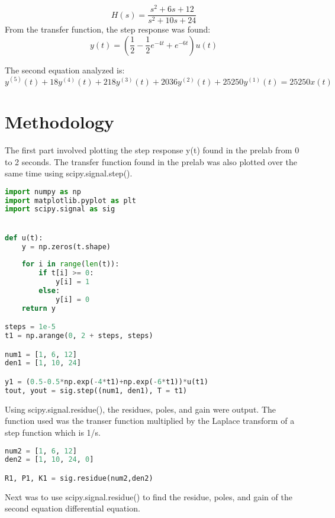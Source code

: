 \documentclass[12pt]{report}
\begin{document}
\begin{equation*}
    H(s) = \frac{s{^2}+6s+12}{s{^2}+10s+24}
\end{equation*}
From the transfer function, the step response was found:
\begin{equation*}
y(t) = (\frac{1}{2}-\frac{1}{2}e^{-4t}+e^{-6t})u(t)
\end{equation*}

The second equation analyzed is:
\begin{equation*}
y^{(5)}(t) + 18y^{(4)}(t) + 218y^{(3)}(t) + 2036y^{(2)}(t) + 25250y^{(1)}(t) = 25250x(t)
\end{equation*}

\section{Methodology}
The first part involved plotting the step response y(t) found in the prelab from 0 to 2 seconds. The transfer function found in the prelab was also plotted over the same time using scipy.signal.step().
\begin{lstlisting}[language=Python, caption=Step response and transfer function plots]
import numpy as np
import matplotlib.pyplot as plt
import scipy.signal as sig


def u(t):
    y = np.zeros(t.shape)
    
    for i in range(len(t)):
        if t[i] >= 0:
            y[i] = 1
        else:
            y[i] = 0
    return y

steps = 1e-5
t1 = np.arange(0, 2 + steps, steps)

num1 = [1, 6, 12]
den1 = [1, 10, 24]

y1 = (0.5-0.5*np.exp(-4*t1)+np.exp(-6*t1))*u(t1)
tout, yout = sig.step((num1, den1), T = t1)

\end{lstlisting}

Using scipy.signal.residue(), the residues, poles, and gain were output. The function used was the transer function multiplied by the Laplace transform of a step function which is 1/s.

\begin{lstlisting}[language=Python, caption=sig.residue() of the first differential equation]
num2 = [1, 6, 12]
den2 = [1, 10, 24, 0]

R1, P1, K1 = sig.residue(num2,den2)
\end{lstlisting}

Next was to use scipy.signal.residue() to find the residue, poles, and gain of the second equation differential equation.
\end{document}
